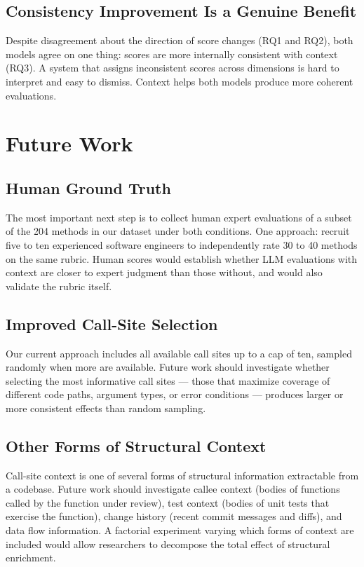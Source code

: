 \documentclass[12pt]{report}
\begin{document}
\subsection{Consistency Improvement Is a Genuine Benefit}

Despite disagreement about the direction of score changes (RQ1 and RQ2), both models agree on one thing: scores are more internally consistent with context (RQ3). A system that assigns inconsistent scores across dimensions is hard to interpret and easy to dismiss. Context helps both models produce more coherent evaluations.


\section{Future Work}

\subsection{Human Ground Truth}

The most important next step is to collect human expert evaluations of a subset of the 204 methods in our dataset under both conditions. One approach: recruit five to ten experienced software engineers to independently rate 30 to 40 methods on the same rubric. Human scores would establish whether LLM evaluations with context are closer to expert judgment than those without, and would also validate the rubric itself.

\subsection{Improved Call-Site Selection}

Our current approach includes all available call sites up to a cap of ten, sampled randomly when more are available. Future work should investigate whether selecting the most informative call sites --- those that maximize coverage of different code paths, argument types, or error conditions --- produces larger or more consistent effects than random sampling.

\subsection{Other Forms of Structural Context}

Call-site context is one of several forms of structural information extractable from a codebase. Future work should investigate callee context (bodies of functions called by the function under review), test context (bodies of unit tests that exercise the function), change history (recent commit messages and diffs), and data flow information. A factorial experiment varying which forms of context are included would allow researchers to decompose the total effect of structural enrichment.
\end{document}

